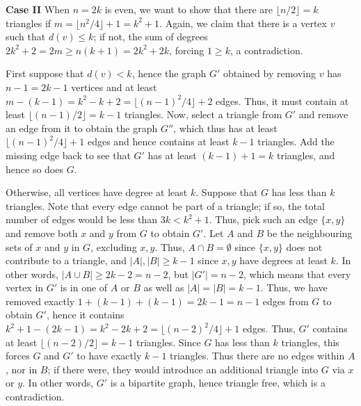 \documentclass[10pt]{article}
\begin{document}
\begin{enumerate}
        \textbf{Case II} When $n = 2k$ is even, we want to show that there are
        $\lfloor n / 2\rfloor = k$ triangles if $m = \lfloor n^2 / 4\rfloor + 1 =
        k^2 + 1$. Again, we claim that there is a vertex $v$ such that $d(v) \leq k$;
        if not, the sum of degrees $2k^2 + 2 = 2m \geq n(k + 1) = 2k^2 + 2k$, forcing
        $1 \geq k$, a contradiction.

        First suppose that $d(v) < k$, hence the graph $G'$ obtained by removing $v$
        has $n - 1 = 2k - 1$ vertices and at least $m - (k - 1) = k^2 - k + 2 =
        \lfloor(n - 1)^2 / 4\rfloor + 2$ edges. Thus, it must contain at least
        $\lfloor (n - 1) / 2\rfloor = k - 1$ triangles. Now, select a triangle from
        $G'$ and remove an edge from it to obtain the graph $G''$, which thus has at
        least $\lfloor(n - 1)^2 / 4\rfloor + 1$ edges and hence contains at least $k
        - 1$ triangles. Add the missing edge back to see that $G'$ has at least $(k -
        1) + 1 = k$ triangles, and hence so does $G$.

        Otherwise, all vertices have degree at least $k$. Suppose that $G$ has less
        than $k$ triangles. Note that every edge cannot
        be part of a triangle; if so, the total number of edges would be less than
        $3k < k^2 + 1$. Thus, pick such an edge $\{x, y\}$ and remove both $x$ and
        $y$ from $G$ to obtain $G'$. Let $A$ and $B$ be the neighbouring sets of $x$
        and $y$ in $G$, excluding $x, y$. Thus, $A \cap B = \emptyset$ since $\{x,
        y\}$ does not contribute to a triangle, and $|A|, |B| \geq k - 1$ since $x,
        y$ have degrees at least $k$. In other words, $|A \cup B| \geq 2k - 2 = n -
        2$, but $|G'| = n - 2$, which means that every vertex in $G'$ is in one of
        $A$ or $B$ as well as $|A| = |B| = k - 1$. Thus, we have removed exactly $1
        + (k - 1) + (k - 1) = 2k - 1 = n - 1$ edges from $G$ to obtain $G'$, hence it
        contains $k^2 + 1 - (2k - 1) = k^2 - 2k + 2 = \lfloor (n - 2)^2 / 4\rfloor +
        1$ edges. Thus, $G'$ contains at least $\lfloor (n - 2) / 2\rfloor = k - 1$
        triangles. Since $G$ has less than $k$ triangles, this forces $G$ and $G'$ to
        have exactly $k - 1$ triangles. Thus there are no edges within $A$, nor in
        $B$; if there were, they would introduce an additional triangle into $G$ via
        $x$ or $y$. In other words, $G'$ is a bipartite graph, hence triangle free,
        which is a contradiction.
    \end{enumerate}
\end{document}
